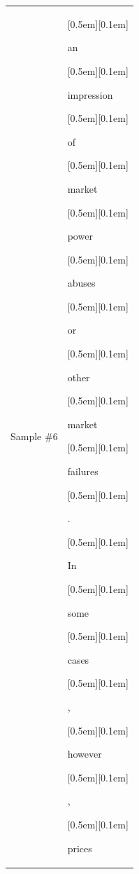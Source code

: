 \begin{table}[ht]
\begin{tabular}{@{}l p{13cm}@{}}
\vspace{10pt}
Sample \#6 &
{\setlength{\fboxsep}{1pt}\raisebox{0pt}[0.5em][0.1em]{\colorbox{Salmon!60}{\strut{ an}}}}{\setlength{\fboxsep}{1pt}\raisebox{0pt}[0.5em][0.1em]{\colorbox{DarkOrchid!25}{\strut{ impression}}}}{\setlength{\fboxsep}{1pt}\raisebox{0pt}[0.5em][0.1em]{\colorbox{DarkOrchid!25}{\strut{ of}}}}{\setlength{\fboxsep}{1pt}\raisebox{0pt}[0.5em][0.1em]{\colorbox{DarkOrchid!25}{\strut{ market}}}}{\setlength{\fboxsep}{1pt}\raisebox{0pt}[0.5em][0.1em]{\colorbox{DarkOrchid!25}{\strut{ power}}}}{\setlength{\fboxsep}{1pt}\raisebox{0pt}[0.5em][0.1em]{\colorbox{DarkOrchid!25}{\strut{ abuses}}}}{\setlength{\fboxsep}{1pt}\raisebox{0pt}[0.5em][0.1em]{\colorbox{DarkOrchid!25}{\strut{ or}}}}{\setlength{\fboxsep}{1pt}\raisebox{0pt}[0.5em][0.1em]{\colorbox{Salmon!60}{\strut{ other}}}}{\setlength{\fboxsep}{1pt}\raisebox{0pt}[0.5em][0.1em]{\colorbox{Salmon!60}{\strut{ market}}}}{\setlength{\fboxsep}{1pt}\raisebox{0pt}[0.5em][0.1em]{\colorbox{DarkOrchid!25}{\strut{ failures}}}}{\setlength{\fboxsep}{1pt}\raisebox{0pt}[0.5em][0.1em]{\colorbox{DarkOrchid!25}{\strut{.}}}}{\setlength{\fboxsep}{1pt}\raisebox{0pt}[0.5em][0.1em]{\colorbox{DarkOrchid!25}{\strut{ In}}}}{\setlength{\fboxsep}{1pt}\raisebox{0pt}[0.5em][0.1em]{\colorbox{DarkOrchid!25}{\strut{ some}}}}{\setlength{\fboxsep}{1pt}\raisebox{0pt}[0.5em][0.1em]{\colorbox{DarkOrchid!25}{\strut{ cases}}}}{\setlength{\fboxsep}{1pt}\raisebox{0pt}[0.5em][0.1em]{\colorbox{DarkOrchid!25}{\strut{,}}}}{\setlength{\fboxsep}{1pt}\raisebox{0pt}[0.5em][0.1em]{\colorbox{DarkOrchid!25}{\strut{ however}}}}{\setlength{\fboxsep}{1pt}\raisebox{0pt}[0.5em][0.1em]{\colorbox{DarkOrchid!25}{\strut{,}}}}{\setlength{\fboxsep}{1pt}\raisebox{0pt}[0.5em][0.1em]{\colorbox{DarkOrchid!25}{\strut{ prices}}}}


\end{tabular}
\end{table}
